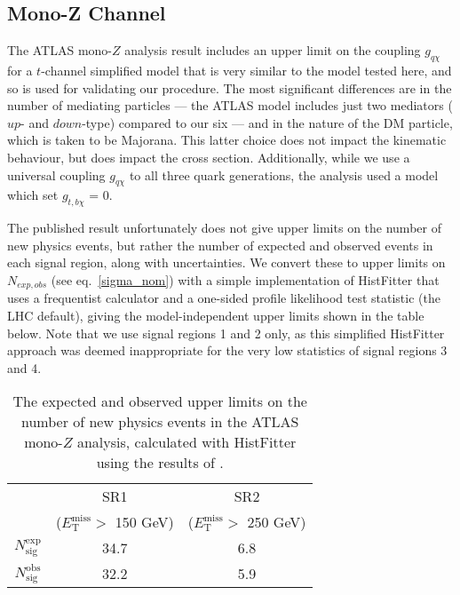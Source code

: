 \subsection{Mono-Z Channel}
\label{monoZ_validation}
\begin{flushleft}

\bigskip

The ATLAS mono-$Z$ analysis result includes an upper limit on the coupling $g_{q \chi}$ for a $t$-channel simplified model that is very similar to the model tested here, and so is used for validating our procedure. The most significant differences are in the number of mediating particles --- the ATLAS model includes just two mediators ($up$- and $down$-type) compared to our six --- and in the nature of the DM particle, which is taken to be Majorana. This latter choice does not impact the kinematic behaviour, but does impact the cross section. Additionally, while we use a universal coupling $g_{q \chi}$ to all three quark generations, the analysis used a model which set $g_{t,b \chi}$ = 0.

The published result unfortunately does not give upper limits on the number of new physics events, but rather the number of expected and observed events in each signal region, along with uncertainties. We convert these to upper limits on $N_{exp,obs}$ (see eq.~\ref{sigma_nom}) with a simple implementation of HistFitter that uses a frequentist calculator and a one-sided profile likelihood test statistic (the LHC default), giving the model-independent upper limits shown in the table below. Note that we use signal regions 1 and 2 only, as this simplified HistFitter approach was deemed inappropriate for the very low statistics of signal regions 3 and 4. 

\begin{table}
\begin{center}
\begin{tabular}{ c  c  c }
\hline
& SR1 & SR2 \T \\
& ($E_{\mathrm{T}}^{\mathrm{miss}} > $ 150 GeV) & ($E_{\mathrm{T}}^{\mathrm{miss}} > $ 250 GeV) \B \\
\hline
$N_{\mathrm{sig}}^{\mathrm{exp}}$ & 34.7 & 6.8 \T \\
$N_{\mathrm{sig}}^{\mathrm{obs}}$ & 32.2 & 5.9 \B \\
\hline
\end{tabular}
\end{center}
\label{tab:Nlim_monoZ}
\caption{The expected and observed upper limits on the number of new physics events in the ATLAS mono-$Z$ analysis, calculated with HistFitter using the results of \cite{Aad:2014monoZlep}.}
\end{table}


\end{flushleft}

